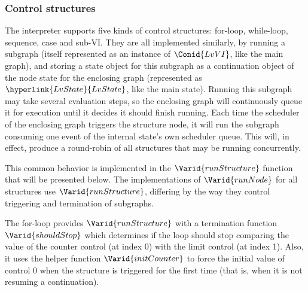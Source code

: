 \resethooks


\subsubsection{Control structures}

The interpreter supports five kinds of control structures: for-loop,
while-loop, sequence, case and sub-VI. They are all implemented similarly, by
running a subgraph (itself represented as an instance of \ensuremath{\Conid{LvVI}}, like the main
graph), and storing a state object for this subgraph as a continuation object
of the node state for the enclosing graph (represented as \ensuremath{\hyperlink{LvState}{LvState}}, like the
main state). Running this subgraph may take several evaluation steps, so the
enclosing graph will continuously queue it for execution until it decides it
should finish running. Each time the scheduler of the enclosing graph triggers
the structure node, it will run the subgraph consuming one event of the
internal state's own scheduler queue. This will, in effect, produce a
round-robin of all structures that may be running concurrently.

This common behavior is implemented in the \ensuremath{\Varid{runStructure}} function that
will be presented below. The implementations of \ensuremath{\Varid{runNode}} for all
structures use \ensuremath{\Varid{runStructure}}, differing by the way they control
triggering and termination of subgraphs.


The for-loop provides \ensuremath{\Varid{runStructure}} with a termination function \ensuremath{\Varid{shouldStop}}
which determines if the loop should stop comparing the value of the counter
control (at index 0) with the limit control (at index 1). Also, it uses the
helper function \ensuremath{\Varid{initCounter}} to force the initial value of control 0 when the
structure is triggered for the first time (that is, when it is not resuming a
continuation).

